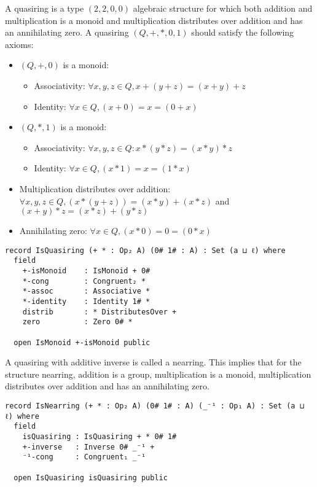 A quasiring is a type $(2,2,0,0)$ algebraic structure for which both addition and
multiplication is a monoid and multiplication distributes over addition and has
an annihilating zero. A quasiring $(Q,+,*,0,1)$ should satisfy the following axioms:
\begin{itemize}
  \item $(Q,+,0)$ is a monoid:
  \begin{itemize}
    \item Associativity: $\forall x,y,z \in Q, x + (y + z) = (x + y) + z$
    \item Identity: $\forall x \in Q, (x + 0) = x = (0 + x)$
  \end{itemize}
  \item $(Q,*,1)$ is a monoid:
  \begin{itemize}
    \item Associativity: $ \forall x,y,z \in Q: x * (y*z)  = (x*y)*z$
    \item Identity: $\forall x \in Q, (x * 1) = x = (1 * x)$
  \end{itemize}
  \item Multiplication distributes over addition: \(\forall x , y , z \in Q, (x * (y + z)) = (x * y) + (x
  * z)\) and \( (x + y) * z = (x * z) + (y * z) \)
  \item Annihilating zero: \(\forall x \in Q, (x * 0) = 0 = (0 * x)\)
\end{itemize}

\begin{verbatim}
record IsQuasiring (+ * : Op₂ A) (0# 1# : A) : Set (a ⊔ ℓ) where
  field
    +-isMonoid    : IsMonoid + 0#
    *-cong        : Congruent₂ *
    *-assoc       : Associative *
    *-identity    : Identity 1# *
    distrib       : * DistributesOver +
    zero          : Zero 0# *

  open IsMonoid +-isMonoid public
\end{verbatim}

A quasiring with additive inverse is called a nearring. This implies that for
the structure nearring, addition is a group, multiplication is a monoid,
multiplication distributes over addition and has an annihilating zero.

\begin{verbatim}
record IsNearring (+ * : Op₂ A) (0# 1# : A) (_⁻¹ : Op₁ A) : Set (a ⊔ ℓ) where
  field
    isQuasiring : IsQuasiring + * 0# 1#
    +-inverse   : Inverse 0# _⁻¹ +
    ⁻¹-cong     : Congruent₁ _⁻¹

  open IsQuasiring isQuasiring public
\end{verbatim}


